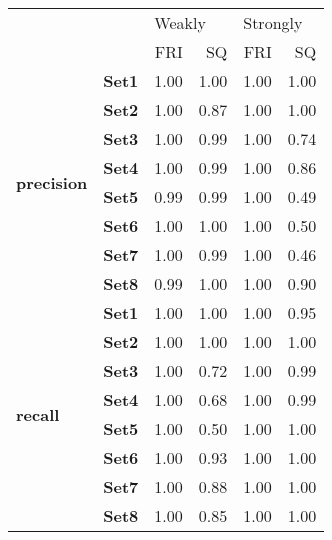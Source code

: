 \begin{tabular}{llrrrr}
\toprule
       &      & \multicolumn{2}{l}{Weakly} & \multicolumn{2}{l}{Strongly} \\
       &      &    FRI &   SQ &      FRI &   SQ \\
\midrule
\multirow{8}{*}{\textbf{precision}} & \textbf{Set1} &   1.00 & 1.00 &     1.00 & 1.00 \\
       & \textbf{Set2} &   1.00 & 0.87 &     1.00 & 1.00 \\
       & \textbf{Set3} &   1.00 & 0.99 &     1.00 & 0.74 \\
       & \textbf{Set4} &   1.00 & 0.99 &     1.00 & 0.86 \\
       & \textbf{Set5} &   0.99 & 0.99 &     1.00 & 0.49 \\
       & \textbf{Set6} &   1.00 & 1.00 &     1.00 & 0.50 \\
       & \textbf{Set7} &   1.00 & 0.99 &     1.00 & 0.46 \\
       & \textbf{Set8} &   0.99 & 1.00 &     1.00 & 0.90 \\
\cline{1-6}
\multirow{8}{*}{\textbf{recall}} & \textbf{Set1} &   1.00 & 1.00 &     1.00 & 0.95 \\
       & \textbf{Set2} &   1.00 & 1.00 &     1.00 & 1.00 \\
       & \textbf{Set3} &   1.00 & 0.72 &     1.00 & 0.99 \\
       & \textbf{Set4} &   1.00 & 0.68 &     1.00 & 0.99 \\
       & \textbf{Set5} &   1.00 & 0.50 &     1.00 & 1.00 \\
       & \textbf{Set6} &   1.00 & 0.93 &     1.00 & 1.00 \\
       & \textbf{Set7} &   1.00 & 0.88 &     1.00 & 1.00 \\
       & \textbf{Set8} &   1.00 & 0.85 &     1.00 & 1.00 \\
\bottomrule
\end{tabular}
